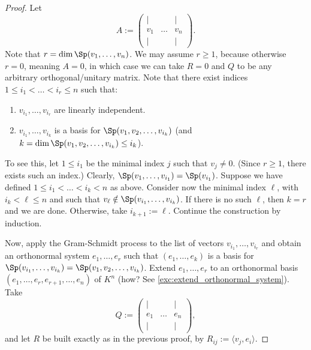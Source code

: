 \begin{proof}
Let
\[
    A := \begin{pmatrix} | & & | \\ v_1 & \dots & v_n \\ | & & | \end{pmatrix}.
\]
Note that $r = \dim \Sp(v_1, \dots, v_n)$.
We may assume $r \geq 1$, because otherwise $r = 0$, meaning $A = 0$, in which case we can take $R = 0$ and $Q$ to be any arbitrary orthogonal/unitary matrix.
Note that there exist indices $1 \leq i_1 < \dots < i_r \leq n$ such that:
\begin{enumerate}[label=\textbf{(\alph*)}]
    \item $v_{i_1}, \dots, v_{i_r}$ are linearly independent.
    \item $v_{i_1}, \dots, v_{i_k}$ is a basis for $\Sp(v_1, v_2, \dots, v_{i_k})$ (and $k = \dim \Sp(v_1, v_2, \dots, v_{i_k}) \leq i_k$).
\end{enumerate}
To see this, let $1 \leq i_1$ be the minimal index $j$ such that $v_j \neq 0$. (Since $r \geq 1$, there exists such an index.) Clearly, $\Sp(v_1, \dots, v_{i_1}) = \Sp(v_{i_1})$. Suppose we have defined $1 \leq i_1 < \dots < i_k < n$ as above. Consider now the minimal index $\ell$, with $i_k < \ell \leq n$ and such that $v_\ell \notin \Sp(v_{i_1}, \dots, v_{i_k})$. If there is no such $\ell$, then $k = r$ and we are done. Otherwise, take $i_{k+1} := \ell$. Continue the construction by induction.

Now, apply the Gram-Schmidt process to the list of vectors $v_{i_1}, \dots, v_{i_r}$ and obtain an orthonormal system $e_1, \dots, e_r$ such that $(e_1, \dots, e_k)$ is a basis for $\Sp(v_{i_1}, \dots, v_{i_k}) = \Sp(v_1, v_2, \dots, v_{i_k})$.
Extend $e_1, \dots, e_r$ to an orthonormal basis $(e_1, \dots, e_r, e_{r+1}, \dots, e_n)$ of $K^n$ (how? See \cref{exc:extend_orthonormal_system}). Take
\[
    Q := \begin{pmatrix} | & & | \\ e_1 & \dots & e_n \\ | & & | \end{pmatrix},
\]
and let $R$ be built exactly as in the previous proof, by $R_{ij} := \langle v_j, e_i \rangle$.


\end{proof}
